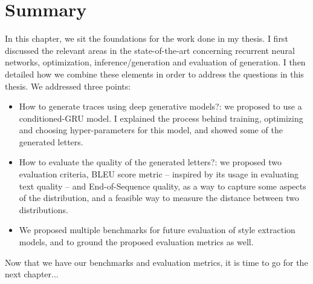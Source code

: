 \section{Summary}

\par In this chapter, we sit the foundations for the work done in my thesis. I first discussed the relevant areas in the state-of-the-art concerning recurrent neural networks, optimization, inference/generation and evaluation of generation. I then detailed how we combine these elements in order to address the questions in this thesis. We addressed three points:
\begin{itemize}
    \item How to generate traces using deep generative models?: we proposed to use a conditioned-GRU model. I explained the process behind training, optimizing and choosing hyper-parameters for this model, and showed some of the generated letters.
    \item How to evaluate the quality of the generated letters?: we proposed two evaluation criteria, BLEU score metric -- inspired by its usage in evaluating text quality -- and End-of-Sequence quality, as a way to capture some aspects of the distribution, and a feasible way to measure the distance between two distributions.
    \item We proposed multiple benchmarks for future evaluation of style extraction models, and to ground the proposed evaluation metrics as well.
\end{itemize}
Now that we have our benchmarks and evaluation metrics, it is time to go for the next chapter...
